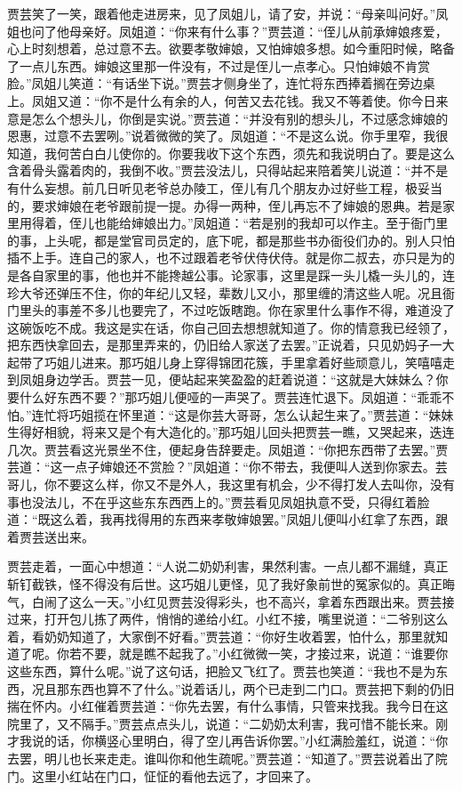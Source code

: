 \begin{parag}
    贾芸笑了一笑，跟着他走进房来，见了凤姐儿，请了安，并说：“母亲叫问好。”凤姐也问了他母亲好。凤姐道：“你来有什么事？”贾芸道：“侄儿从前承婶娘疼爱，心上时刻想着，总过意不去。欲要孝敬婶娘，又怕婶娘多想。如今重阳时候，略备了一点儿东西。婶娘这里那一件没有，不过是侄儿一点孝心。只怕婶娘不肯赏脸。”凤姐儿笑道：“有话坐下说。”贾芸才侧身坐了，连忙将东西捧着搁在旁边桌上。凤姐又道：“你不是什么有余的人，何苦又去花钱。我又不等着使。你今日来意是怎么个想头儿，你倒是实说。”贾芸道：“并没有别的想头儿，不过感念婶娘的恩惠，过意不去罢咧。”说着微微的笑了。凤姐道：“不是这么说。你手里窄，我很知道，我何苦白白儿使你的。你要我收下这个东西，须先和我说明白了。要是这么含着骨头露着肉的，我倒不收。”贾芸没法儿，只得站起来陪着笑儿说道：“并不是有什么妄想。前几日听见老爷总办陵工，侄儿有几个朋友办过好些工程，极妥当的，要求婶娘在老爷跟前提一提。办得一两种，侄儿再忘不了婶娘的恩典。若是家里用得着，侄儿也能给婶娘出力。”凤姐道：“若是别的我却可以作主。至于衙门里的事，上头呢，都是堂官司员定的，底下呢，都是那些书办衙役们办的。别人只怕插不上手。连自己的家人，也不过跟着老爷伏侍伏侍。就是你二叔去，亦只是为的是各自家里的事，他也并不能搀越公事。论家事，这里是踩一头儿橇一头儿的，连珍大爷还弹压不住，你的年纪儿又轻，辈数儿又小，那里缠的清这些人呢。况且衙门里头的事差不多儿也要完了，不过吃饭瞎跑。你在家里什么事作不得，难道没了这碗饭吃不成。我这是实在话，你自己回去想想就知道了。你的情意我已经领了，把东西快拿回去，是那里弄来的，仍旧给人家送了去罢。”正说着，只见奶妈子一大起带了巧姐儿进来。那巧姐儿身上穿得锦团花簇，手里拿着好些顽意儿，笑嘻嘻走到凤姐身边学舌。贾芸一见，便站起来笑盈盈的赶着说道：“这就是大妹妹么？你要什么好东西不要？”那巧姐儿便哑的一声哭了。贾芸连忙退下。凤姐道：“乖乖不怕。”连忙将巧姐揽在怀里道：“这是你芸大哥哥，怎么认起生来了。”贾芸道：“妹妹生得好相貌，将来又是个有大造化的。”那巧姐儿回头把贾芸一瞧，又哭起来，迭连几次。贾芸看这光景坐不住，便起身告辞要走。凤姐道：“你把东西带了去罢。”贾芸道：“这一点子婶娘还不赏脸？”凤姐道：“你不带去，我便叫人送到你家去。芸哥儿，你不要这么样，你又不是外人，我这里有机会，少不得打发人去叫你，没有事也没法儿，不在乎这些东东西西上的。”贾芸看见凤姐执意不受，只得红着脸道：“既这么着，我再找得用的东西来孝敬婶娘罢。”凤姐儿便叫小红拿了东西，跟着贾芸送出来。
\end{parag}


\begin{parag}
    贾芸走着，一面心中想道：“人说二奶奶利害，果然利害。一点儿都不漏缝，真正斩钉截铁，怪不得没有后世。这巧姐儿更怪，见了我好象前世的冤家似的。真正晦气，白闹了这么一天。”小红见贾芸没得彩头，也不高兴，拿着东西跟出来。贾芸接过来，打开包儿拣了两件，悄悄的递给小红。小红不接，嘴里说道：“二爷别这么着，看奶奶知道了，大家倒不好看。”贾芸道：“你好生收着罢，怕什么，那里就知道了呢。你若不要，就是瞧不起我了。”小红微微一笑，才接过来，说道：“谁要你这些东西，算什么呢。”说了这句话，把脸又飞红了。贾芸也笑道：“我也不是为东西，况且那东西也算不了什么。”说着话儿，两个已走到二门口。贾芸把下剩的仍旧揣在怀内。小红催着贾芸道：“你先去罢，有什么事情，只管来找我。我今日在这院里了，又不隔手。”贾芸点点头儿，说道：“二奶奶太利害，我可惜不能长来。刚才我说的话，你横竖心里明白，得了空儿再告诉你罢。”小红满脸羞红，说道：“你去罢，明儿也长来走走。谁叫你和他生疏呢。”贾芸道：“知道了。”贾芸说着出了院门。这里小红站在门口，怔怔的看他去远了，才回来了。
\end{parag}


